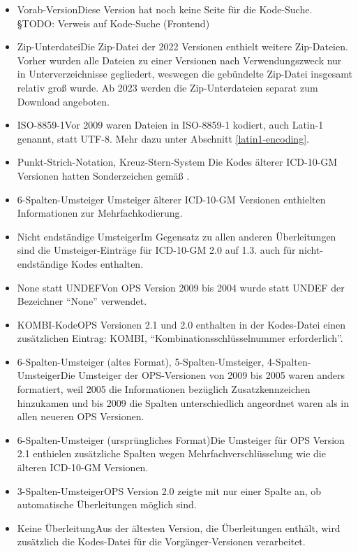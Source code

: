 \begin{itemize}
\item Vorab-Version\newline Diese Version hat noch keine Seite für die Kode-Suche. {\color{blue} §TODO: Verweis auf Kode-Suche (Frontend)}
\item Zip-Unterdatei\newline Die Zip-Datei der 2022 Versionen enthielt weitere Zip-Dateien. Vorher wurden alle Dateien zu einer Versionen nach Verwendungszweck nur in Unterverzeichnisse gegliedert, weswegen die gebündelte Zip-Datei insgesamt relativ groß wurde. Ab 2023 werden die Zip-Unterdateien separat zum Download angeboten.
\item ISO-8859-1\newline Vor 2009 waren Dateien in ISO-8859-1 kodiert, auch Latin-1 genannt, statt UTF-8. Mehr dazu unter Abschnitt \ref{latin1-encoding}.
\item Punkt-Strich-Notation, Kreuz-Stern-System \newline Die Kodes älterer ICD-10-GM Versionen hatten Sonderzeichen gemäß \citep{bfarmicdkk}.
\item 6-Spalten-Umsteiger \newline Umsteiger älterer ICD-10-GM Versionen enthielten Informationen zur Mehrfachkodierung. 
\item Nicht endständige Umsteiger\newline Im Gegensatz zu allen anderen Überleitungen sind die Umsteiger-Einträge für ICD-10-GM 2.0 auf 1.3. auch für nicht-endständige Kodes enthalten. 
\item None statt UNDEF\newline Von OPS Version 2009 bis 2004 wurde statt UNDEF der Bezeichner ``None'' verwendet. 
\item KOMBI-Kode\newline OPS Versionen 2.1 und 2.0 enthalten in der Kodes-Datei einen zusätzlichen Eintrag: KOMBI, ``Kombinationsschlüsselnummer erforderlich''. 
\item 6-Spalten-Umsteiger (altes Format), 5-Spalten-Umsteiger, 4-Spalten-Umsteiger\newline Die Umsteiger der OPS-Versionen von 2009 bis 2005 waren anders formatiert, weil 2005 die Informationen bezüglich Zusatzkennzeichen hinzukamen und bis 2009 die Spalten unterschiedlich angeordnet waren als in allen neueren OPS Versionen. 
\item 6-Spalten-Umsteiger (ursprüngliches Format)\newline Die Umsteiger für OPS Version 2.1 enthielen zusätzliche Spalten wegen Mehrfachverschlüsselung wie die älteren ICD-10-GM Versionen. 
\item 3-Spalten-Umsteiger\newline OPS Version 2.0 zeigte mit nur einer Spalte an, ob automatische Überleitungen möglich sind. 
\item Keine Überleitung\newline Aus der ältesten Version, die Überleitungen enthält, wird zusätzlich die Kodes-Datei für die Vorgänger-Versionen verarbeitet.
\end{itemize}


